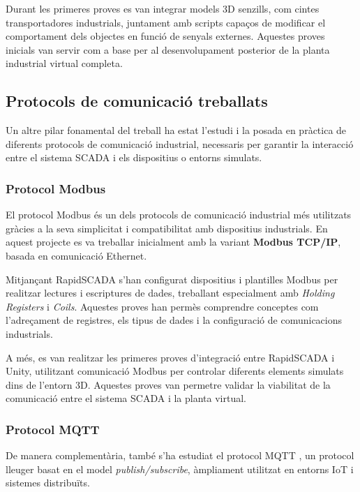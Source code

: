 \documentclass[a4paper,11pt,DIV=13,headings=normal,abstract=true,twoside=semi]{article}
\begin{document}
Durant les primeres proves es van integrar models 3D senzills, com cintes transportadores industrials, juntament amb scripts capaços de modificar el comportament dels objectes en funció de senyals externes. Aquestes proves inicials van servir com a base per al desenvolupament posterior de la planta industrial virtual completa.

\subsection{Protocols de comunicació treballats}

Un altre pilar fonamental del treball ha estat l'estudi i la posada en pràctica de diferents protocols de comunicació industrial, necessaris per garantir la interacció entre el sistema SCADA i els dispositius o entorns simulats.

\subsubsection{Protocol Modbus}

El protocol Modbus és un dels protocols de comunicació industrial més utilitzats gràcies a la seva simplicitat i compatibilitat amb dispositius industrials. En aquest projecte es va treballar inicialment amb la variant \textbf{Modbus TCP/IP}, basada en comunicació Ethernet.

Mitjançant RapidSCADA s'han configurat dispositius i plantilles Modbus per realitzar lectures i escriptures de dades, treballant especialment amb \textit{Holding Registers} i \textit{Coils}. Aquestes proves han permès comprendre conceptes com l'adreçament de registres, els tipus de dades i la configuració de comunicacions industrials.

A més, es van realitzar les primeres proves d'integració entre RapidSCADA i Unity, utilitzant comunicació Modbus per controlar diferents elements simulats dins de l'entorn 3D. Aquestes proves van permetre validar la viabilitat de la comunicació entre el sistema SCADA i la planta virtual.

\subsubsection{Protocol MQTT}

De manera complementària, també s'ha estudiat el protocol MQTT \cite{Team2015MQTT,mqtt_unity_guide}, un protocol lleuger basat en el model \textit{publish/subscribe}, àmpliament utilitzat en entorns IoT i sistemes distribuïts.
\end{document}
